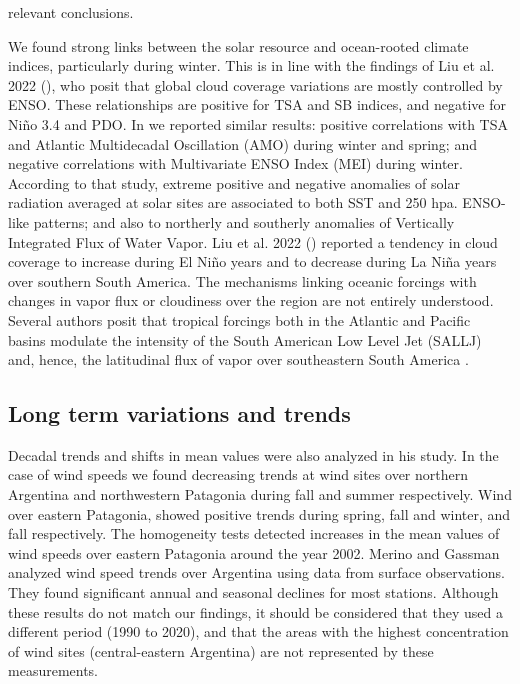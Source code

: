 \documentclass[AMA,Times1COL]{WileyNJDv5} %
\begin{document}
\begin{linenumbers}
relevant conclusions. 

We found strong links between the solar resource and ocean-rooted climate indices, particularly during winter. This is in line with the findings of Liu et al. 2022 (\cite{liu2022opposing}), who posit that global cloud coverage variations are mostly controlled by ENSO. These relationships are positive for TSA and SB indices, and negative for Niño 3.4 and PDO. In \cite{bianchi2022assessing} we reported similar results: positive correlations with TSA and Atlantic Multidecadal Oscillation (AMO) during winter and spring; and negative correlations with Multivariate ENSO Index (MEI) during winter.
According to that study, extreme positive and negative anomalies of solar radiation averaged at solar sites are associated to both SST and 250 hpa. ENSO-like patterns; and also to northerly and southerly anomalies of Vertically Integrated Flux of Water Vapor. Liu et al. 2022 (\cite{liu2022opposing}) reported a tendency in cloud coverage to increase during El Niño years and to decrease during La Niña years over southern South America. The mechanisms linking oceanic forcings with changes in vapor flux or cloudiness over the region are not entirely understood. Several authors posit that tropical forcings both in the Atlantic and Pacific basins modulate the intensity of the South American Low Level Jet (SALLJ) and, hence, the latitudinal flux of vapor over southeastern South America \cite{chiessi2009possible, seager2010tropical, jones2018influence, montini2019south, cai2020climate}.

\subsection{Long term variations and trends}

Decadal trends and shifts in mean values were also analyzed in his study. In the case of wind speeds we found decreasing trends at wind sites over northern Argentina and northwestern Patagonia during fall and summer respectively. Wind over eastern Patagonia, showed positive trends during spring, fall and winter, and fall respectively. The homogeneity tests detected increases in the mean values of wind speeds over eastern Patagonia around the year 2002. Merino and Gassman \cite{merino2022wind} analyzed wind speed trends over Argentina using data from surface observations. They found significant annual and seasonal declines for most stations. Although these results do not match our findings, it should be considered that they used a different period (1990 to 2020), and that the areas with the highest concentration of wind sites (central-eastern Argentina) are not represented by these measurements.


\end{linenumbers}
\end{document}
